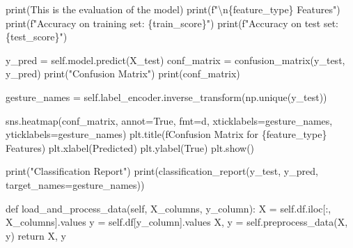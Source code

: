 \documentclass[
  letterpaper,
  DIV=11,
  numbers=noendperiod]{scrreprt}
\newenvironment{Shaded}{\begin{snugshade}}{\end{snugshade}}
\newcommand{\BuiltInTok}[1]{\textcolor[rgb]{0.00,0.23,0.31}{#1}}
\newcommand{\CharTok}[1]{\textcolor[rgb]{0.13,0.47,0.30}{#1}}
\newcommand{\ControlFlowTok}[1]{\textcolor[rgb]{0.00,0.23,0.31}{#1}}
\newcommand{\KeywordTok}[1]{\textcolor[rgb]{0.00,0.23,0.31}{#1}}
\newcommand{\NormalTok}[1]{\textcolor[rgb]{0.00,0.23,0.31}{#1}}
\newcommand{\OperatorTok}[1]{\textcolor[rgb]{0.37,0.37,0.37}{#1}}
\newcommand{\SpecialCharTok}[1]{\textcolor[rgb]{0.37,0.37,0.37}{#1}}
\newcommand{\SpecialStringTok}[1]{\textcolor[rgb]{0.13,0.47,0.30}{#1}}
\newcommand{\StringTok}[1]{\textcolor[rgb]{0.13,0.47,0.30}{#1}}
\newcommand{\VariableTok}[1]{\textcolor[rgb]{0.07,0.07,0.07}{#1}}
\begin{document}
\begin{Shaded}
\begin{Highlighting}[]
        \BuiltInTok{print}\NormalTok{(}\StringTok{\textquotesingle{}This is the evaluation of the model\textquotesingle{}}\NormalTok{)}
        \BuiltInTok{print}\NormalTok{(}\SpecialStringTok{f"}\CharTok{\textbackslash{}n}\SpecialCharTok{\{}\NormalTok{feature\_type}\SpecialCharTok{\}}\SpecialStringTok{ Features"}\NormalTok{)}
        \BuiltInTok{print}\NormalTok{(}\SpecialStringTok{f"Accuracy on training set: }\SpecialCharTok{\{}\NormalTok{train\_score}\SpecialCharTok{\}}\SpecialStringTok{"}\NormalTok{)}
        \BuiltInTok{print}\NormalTok{(}\SpecialStringTok{f"Accuracy on test set: }\SpecialCharTok{\{}\NormalTok{test\_score}\SpecialCharTok{\}}\SpecialStringTok{"}\NormalTok{)}
        
\NormalTok{        y\_pred }\OperatorTok{=} \VariableTok{self}\NormalTok{.model.predict(X\_test)}
\NormalTok{        conf\_matrix }\OperatorTok{=}\NormalTok{ confusion\_matrix(y\_test, y\_pred)}
        \BuiltInTok{print}\NormalTok{(}\StringTok{"Confusion Matrix"}\NormalTok{)}
        \BuiltInTok{print}\NormalTok{(conf\_matrix)}
        
\NormalTok{        gesture\_names }\OperatorTok{=} \VariableTok{self}\NormalTok{.label\_encoder.inverse\_transform(np.unique(y\_test))}
        
\NormalTok{        sns.heatmap(conf\_matrix, annot}\OperatorTok{=}\VariableTok{True}\NormalTok{, fmt}\OperatorTok{=}\StringTok{\textquotesingle{}d\textquotesingle{}}\NormalTok{, xticklabels}\OperatorTok{=}\NormalTok{gesture\_names, yticklabels}\OperatorTok{=}\NormalTok{gesture\_names)}
\NormalTok{        plt.title(}\SpecialStringTok{f\textquotesingle{}Confusion Matrix for }\SpecialCharTok{\{}\NormalTok{feature\_type}\SpecialCharTok{\}}\SpecialStringTok{ Features\textquotesingle{}}\NormalTok{)}
\NormalTok{        plt.xlabel(}\StringTok{\textquotesingle{}Predicted\textquotesingle{}}\NormalTok{)}
\NormalTok{        plt.ylabel(}\StringTok{\textquotesingle{}True\textquotesingle{}}\NormalTok{)}
\NormalTok{        plt.show()}
        
        \BuiltInTok{print}\NormalTok{(}\StringTok{"Classification Report"}\NormalTok{)}
        \BuiltInTok{print}\NormalTok{(classification\_report(y\_test, y\_pred, target\_names}\OperatorTok{=}\NormalTok{gesture\_names))}

    \KeywordTok{def}\NormalTok{ load\_and\_process\_data(}\VariableTok{self}\NormalTok{, X\_columns, y\_column):}
\NormalTok{        X }\OperatorTok{=} \VariableTok{self}\NormalTok{.df.iloc[:, X\_columns].values}
\NormalTok{        y }\OperatorTok{=} \VariableTok{self}\NormalTok{.df[y\_column].values}
\NormalTok{        X, y }\OperatorTok{=} \VariableTok{self}\NormalTok{.preprocess\_data(X, y)}
        \ControlFlowTok{return}\NormalTok{ X, y}
\end{Highlighting}
\end{Shaded}
\end{document}

